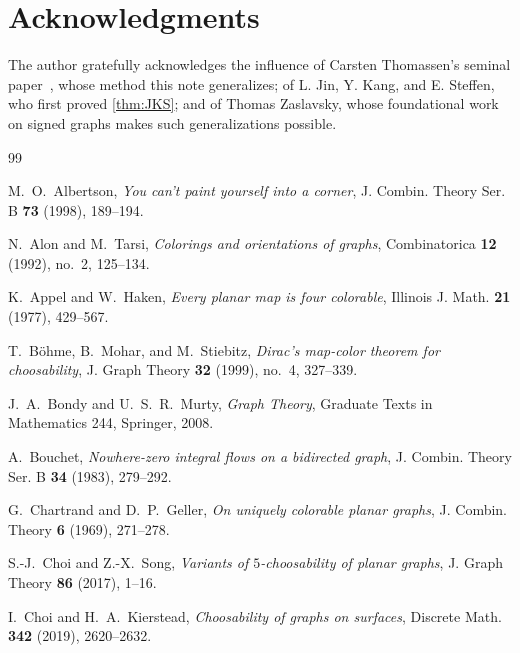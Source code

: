 \documentclass[11pt,a4paper]{article}
\theoremstyle{plain}
\theoremstyle{definition}
\begin{document}
\section*{Acknowledgments}

The author gratefully acknowledges the influence of Carsten
Thomassen's seminal paper~\cite{Thomassen1994}, whose method this
note generalizes; of L. Jin, Y. Kang, and E. Steffen, who first
proved \cref{thm:JKS}; and of Thomas Zaslavsky, whose foundational
work on signed graphs makes such generalizations possible.

\begin{thebibliography}{99}

M.~O.~Albertson,
\emph{You can't paint yourself into a corner},
J. Combin. Theory Ser. B \textbf{73} (1998), 189--194.

N.~Alon and M.~Tarsi,
\emph{Colorings and orientations of graphs},
Combinatorica \textbf{12} (1992), no.~2, 125--134.

K.~Appel and W.~Haken,
\emph{Every planar map is four colorable},
Illinois J. Math. \textbf{21} (1977), 429--567.

T.~B\"ohme, B.~Mohar, and M.~Stiebitz,
\emph{Dirac's map-color theorem for choosability},
J. Graph Theory \textbf{32} (1999), no.~4, 327--339.

J.~A.~Bondy and U.~S.~R.~Murty,
\emph{Graph Theory},
Graduate Texts in Mathematics 244, Springer, 2008.

A.~Bouchet,
\emph{Nowhere-zero integral flows on a bidirected graph},
J. Combin. Theory Ser. B \textbf{34} (1983), 279--292.

G.~Chartrand and D.~P.~Geller,
\emph{On uniquely colorable planar graphs},
J. Combin. Theory \textbf{6} (1969), 271--278.

S.-J.~Choi and Z.-X.~Song,
\emph{Variants of $5$-choosability of planar graphs},
J. Graph Theory \textbf{86} (2017), 1--16.

I.~Choi and H.~A.~Kierstead,
\emph{Choosability of graphs on surfaces},
Discrete Math. \textbf{342} (2019), 2620--2632.


\end{thebibliography}
\end{document}
